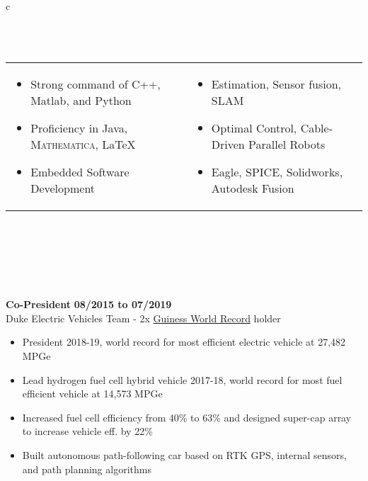 \documentclass[11pt]{amsart}
\newcommand*\ruleline[1]{\par\noindent\raisebox{.8ex}{\makebox[\linewidth]{\hrulefill\hspace{1ex}\raisebox{-.8ex}{\Large~#1~}\hspace{1ex}\hrulefill}}\\ \-\ \vspace{-1em}}
\begin{document}
\begin{center}
\begin{tabular}{c}
	\ruleline{Skills}
	\begin{minipage}{\textwidth}
	\vspace{-1em}
	\begin{tabular}{p{}p{\dimexpr .5\textwidth-2\tabcolsep}}
			\begin{itemize}[leftmargin=*]
				\item Strong command of C++, Matlab, and Python
				\item Proficiency in Java, \textsc{Mathematica}, \LaTeX
				\item Embedded Software Development
			\end{itemize}
		&
			\begin{itemize}[leftmargin=*]
				\item Estimation, Sensor fusion, SLAM
				\item Optimal Control, Cable-Driven Parallel Robots
				\item Eagle, SPICE, Solidworks, Autodesk Fusion
			\end{itemize}
	\end{tabular}
	\end{minipage}\\~ \vspace{-2em}\\

	\ruleline{Activities}
	\begin{minipage}{\textwidth}
		{\bf Co-President} \hfill {\bf 08/2015 to 07/2019}\\
		{Duke Electric Vehicles Team - 2x \href{http://www.guinnessworldrecords.com/world-records/most-fuel-efficient-vehicle}{Guiness World Record} holder}
		\begin{itemize}
			\item President 2018-19, world record for most efficient electric vehicle at 27,482 MPGe
			\item Lead hydrogen fuel cell hybrid vehicle 2017-18, world record for most fuel efficient vehicle at 14,573 MPGe
			\item Increased fuel cell efficiency from 40\% to 63\% and designed super-cap array to increase vehicle eff. by 22\%
			\item Built autonomous path-following car based on RTK GPS, internal sensors, and path planning algorithms
		\end{itemize}
	\end{minipage}%
\end{tabular}\end{center}
\end{document}
